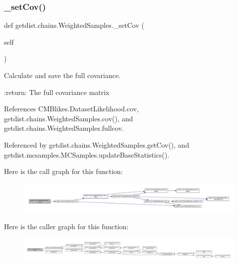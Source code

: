 \subsubsection{\texorpdfstring{\+\_\+set\+Cov()}{\_setCov()}}
{\footnotesize\ttfamily def getdist.\+chains.\+Weighted\+Samples.\+\_\+set\+Cov (\begin{DoxyParamCaption}\item[{}]{self }\end{DoxyParamCaption})\hspace{0.3cm}{\ttfamily [private]}}

\begin{DoxyVerb}Calculate and save the full covariance.

:return: The full covariance matrix
\end{DoxyVerb}
 

References C\+M\+Blikes.\+Dataset\+Likelihood.\+cov, getdist.\+chains.\+Weighted\+Samples.\+cov(), and getdist.\+chains.\+Weighted\+Samples.\+fullcov.



Referenced by getdist.\+chains.\+Weighted\+Samples.\+get\+Cov(), and getdist.\+mcsamples.\+M\+C\+Samples.\+update\+Base\+Statistics().

Here is the call graph for this function\+:
\nopagebreak
\begin{figure}[H]
\begin{center}
\leavevmode
\includegraphics[width=350pt]{classgetdist_1_1chains_1_1WeightedSamples_a50c43f2b7f5f0ccd480d227a950a52f1_cgraph}
\end{center}
\end{figure}
Here is the caller graph for this function\+:
\nopagebreak
\begin{figure}[H]
\begin{center}
\leavevmode
\includegraphics[width=350pt]{classgetdist_1_1chains_1_1WeightedSamples_a50c43f2b7f5f0ccd480d227a950a52f1_icgraph}
\end{center}
\end{figure}
\mbox{\label{classgetdist_1_1chains_1_1WeightedSamples_a703edf346f9300d9251c0f7be93d6276}} 
